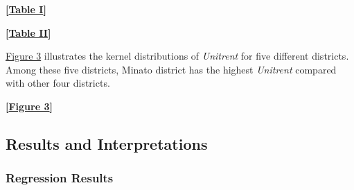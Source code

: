 \documentclass[a4paper, 12pt]{article} %
\newcommand{\var}[1][\textit]{#1}
\begin{document}
\bigskip
 \centerline{\bf [\hyperref[tb1]{Table I}]}
\bigskip

\bigskip
 \centerline{\bf [\hyperref[tb2]{Table II}]}
\bigskip

\hyperref[fig3]{Figure 3} illustrates the kernel distributions of \var{Unitrent} for five different districts. Among these five districts, Minato district has the highest \var{Unitrent} compared with other four districts. 

\bigskip
 \centerline{\bf [\hyperref[fig3]{Figure 3}]}
\bigskip

\subsection{Results and Interpretations}
\subsubsection{Regression Results}
\end{document}
